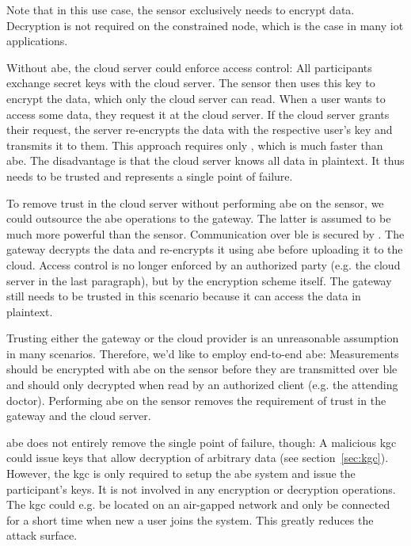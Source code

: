 Note that in this use case, the sensor exclusively needs to encrypt data.
Decryption is not required on the constrained node, which is the case in many \acrshort{iot} applications.

Without \acrshort{abe}, the cloud server could enforce access control:
All participants exchange secret keys with the cloud server.
The sensor then uses this key to encrypt the data, which only the cloud server can read.
When a user wants to access some data, they request it at the cloud server.
If the cloud server grants their request, the server re-encrypts the data with the respective user's key and transmits it to them.
This approach requires only , which is much faster than \acrshort{abe}.
The disadvantage is that the cloud server knows all data in plaintext. It thus needs to be trusted and represents a single point of failure.

To remove trust in the cloud server without performing \acrshort{abe} on the sensor, we could outsource the \acrshort*{abe} operations to the gateway.
The latter is assumed to be much more powerful than the sensor.
Communication over \acrshort{ble} is secured by .
The gateway decrypts the data and re-encrypts it using \acrshort{abe} before uploading it to the cloud.
Access control is no longer enforced by an authorized party (e.g. the cloud server in the last paragraph), but by the encryption scheme itself.
The gateway still needs to be trusted in this scenario because it can access the data in plaintext.

Trusting either the gateway or the cloud provider is an unreasonable assumption in many scenarios.
Therefore, we'd like to employ end-to-end \acrlong{abe}:
Measurements should be encrypted with \acrshort{abe} on the sensor before they are transmitted over \acrshort{ble} and should only decrypted when read by an authorized client (e.g. the attending doctor).
Performing \acrshort{abe} on the sensor removes the requirement of trust in the gateway and the cloud server.

\Acrshort{abe} does not entirely remove the single point of failure, though:
A malicious \acrfull{kgc} could issue keys that allow decryption of arbitrary data (see section~\ref{sec:kgc}).
However, the \acrshort{kgc} is only required to setup the \acrshort{abe} system and issue the participant's keys.
It is not involved in any encryption or decryption operations.
The \acrshort{kgc} could e.g. be located on an air-gapped network and only be connected for a short time when new a user joins the system. 
This greatly reduces the attack surface.


